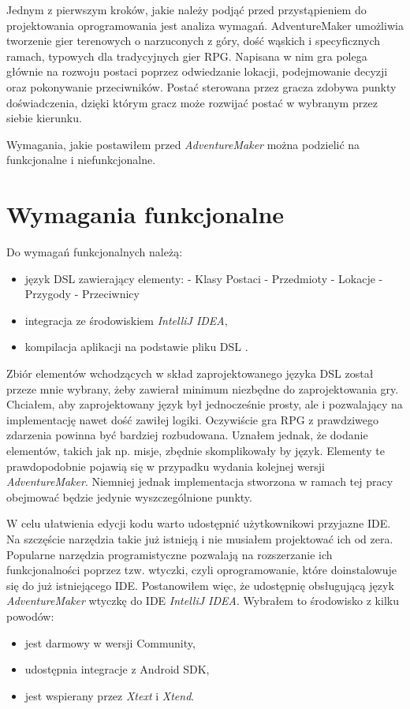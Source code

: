 \documentclass[openright]{xmgr}
\begin{document}
Jednym z pierwszym kroków, jakie należy podjąć przed przystąpieniem do projektowania oprogramowania jest analiza wymagań. AdventureMaker umożliwia tworzenie gier terenowych o narzuconych z góry, dość wąskich i specyficznych ramach, typowych dla tradycyjnych gier RPG. Napisana w nim gra polega głównie na rozwoju postaci poprzez odwiedzanie lokacji, podejmowanie decyzji oraz pokonywanie przeciwników. Postać sterowana przez gracza zdobywa punkty doświadczenia, dzięki którym gracz może rozwijać postać w wybranym przez siebie kierunku. 

Wymagania, jakie postawiłem przed \textit{AdventureMaker} można podzielić na funkcjonalne i niefunkcjonalne.

\section{Wymagania funkcjonalne}
Do wymagań funkcjonalnych należą:
\begin{itemize}
\item język DSL zawierający elementy:
\subitem - Klasy Postaci
\subitem - Przedmioty
\subitem - Lokacje
\subitem - Przygody
\subitem - Przeciwnicy
\item integracja ze środowiskiem \textit{IntelliJ IDEA},
\item kompilacja aplikacji na podstawie pliku DSL .
\end{itemize}

Zbiór elementów wchodzących w skład zaprojektowanego języka DSL został przeze mnie wybrany, żeby zawierał minimum niezbędne do zaprojektowania gry. Chciałem, aby zaprojektowany język był jednocześnie prosty, ale i pozwalający na implementację nawet dość zawiłej logiki. Oczywiście gra RPG z prawdziwego zdarzenia powinna być bardziej rozbudowana. Uznałem jednak, że dodanie elementów, takich jak np. misje, zbędnie skomplikowały by język. Elementy te prawdopodobnie pojawią się w przypadku wydania kolejnej wersji \textit{AdventureMaker}. Niemniej jednak implementacja stworzona w ramach tej pracy obejmować będzie jedynie wyszczególnione punkty.

W celu ułatwienia edycji kodu warto udostępnić użytkownikowi przyjazne IDE. Na szczęście narzędzia takie już istnieją i nie musiałem projektować ich od zera. Popularne narzędzia programistyczne pozwalają na rozszerzanie ich funkcjonalności poprzez tzw. wtyczki, czyli oprogramowanie, które doinstalowuje się do już istniejącego IDE. Postanowiłem więc, że udostępnię obsługującą język \textit{AdventureMaker} wtyczkę do IDE \textit{IntelliJ IDEA}. Wybrałem to środowisko z kilku powodów:
\begin{itemize}	
\item jest darmowy w wersji Community,
\item udostępnia integracje z Android SDK,
\item jest wspierany przez \textit{Xtext} i \textit{Xtend}.
\end{itemize}
\end{document}
